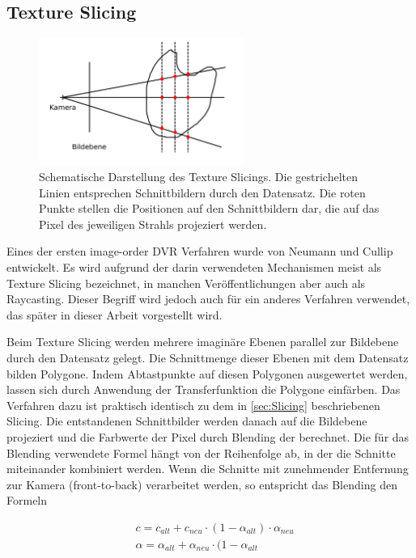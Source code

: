 \documentclass[a4paper,fontsize=12pt,toc=bib,halfparskip,ngerman]{scrartcl}
\begin{document}
\subsection{Texture Slicing}
\begin{figure}
	\centering
	\includegraphics[width=0.6\textwidth]{pictures/Texture_Slicing}
	\caption{Schematische Darstellung des Texture Slicings. Die gestrichelten Linien entsprechen Schnittbildern durch den Datensatz. Die roten Punkte stellen die Positionen auf den Schnittbildern dar, die auf das Pixel des jeweiligen Strahls projeziert werden.}
	\label{TexureSlicing}
\end{figure}
\label{sec:TextureSlicing}
Eines der ersten image-order DVR Verfahren wurde von Neumann und Cullip \cite{cullip1993accelerating} entwickelt. Es wird aufgrund der darin verwendeten Mechanismen meist als Texture Slicing bezeichnet, in manchen Ver\"offentlichungen aber auch als Raycasting. Dieser Begriff wird jedoch auch f\"ur ein anderes Verfahren verwendet, das sp\"ater in dieser Arbeit vorgestellt wird.

Beim Texture Slicing werden mehrere imagin\"are Ebenen parallel zur Bildebene durch den Datensatz gelegt. Die Schnittmenge dieser Ebenen mit dem Datensatz bilden Polygone. Indem Abtastpunkte auf diesen Polygonen ausgewertet werden, lassen sich durch Anwendung der Transferfunktion die Polygone einf\"arben. Das Verfahren dazu ist praktisch identisch zu dem in \cref{sec:Slicing} beschriebenen Slicing. Die entstandenen Schnittbilder werden danach auf die Bildebene projeziert und die Farbwerte der Pixel durch Blending der berechnet. Die f\"ur das Blending verwendete Formel h\"angt von der Reihenfolge ab, in der die Schnitte miteinander kombiniert werden. Wenn die Schnitte mit zunehmender Entfernung zur Kamera (front-to-back) verarbeitet werden, so entspricht das Blending den Formeln

\begin{align}
&c = c_{alt} + c_{neu}\cdot(1-\alpha_{alt})\cdot\alpha_{neu}
\label{front-to-back-color}\\ 
&\alpha = \alpha_{alt} + \alpha_{neu}\cdot(1-\alpha_{alt} 
\label{front-to-back-alpha}
\end{align}
\end{document}
